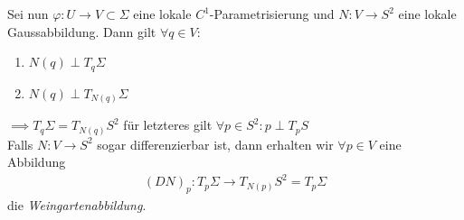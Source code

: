 \documentclass[../main.tex]{subfiles}
\begin{document}
Sei nun $\varphi : U \to V \subset \Sigma$ eine lokale $C^{1}$-Parametrisierung und $N:V \to S^{2}$ eine lokale Gaussabbildung. Dann gilt $\forall q \in V$:
\begin{enumerate}
    \item $N(q)\perp T_{q}\Sigma$
    \item $N(q)\perp T_{N(q)}\Sigma$
\end{enumerate}
$\implies T_{q}\Sigma = T_{N(q)}S^{2}$
für letzteres gilt $\forall p \in S^{2}: p\perp T_{p}S$\\ 
Falls $N:V \to S^{2}$ sogar differenzierbar ist, dann erhalten wir $\forall p \in V$ eine Abbildung
\begin{align*}
    (DN)_{p}: T_{p}\Sigma \to T_{N(p)}S^{2} = T_{p}\Sigma    
\end{align*}
die \emph{Weingartenabbildung}.
\end{document}
